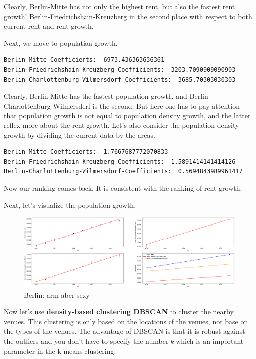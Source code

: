 \documentclass[11pt]{article}
\begin{document}
    
    Clearly, Berlin-Mitte has not only the highest rent, but also the
fastest rent growth! Berlin-Friedrichshain-Kreuzberg in the second place
with respect to both current rent and rent growth.

Next, we move to population growth.

    

    \begin{Verbatim}[commandchars=\\\{\}]
Berlin-Mitte-Coefficients:  6973.436363636361
Berlin-Friedrichshain-Kreuzberg-Coefficients:  3203.7090909090903
Berlin-Charlottenburg-Wilmersdorf-Coefficients:  3685.70303030303
    \end{Verbatim}

    Clearly, Berlin-Mitte has the fastest population growth, and
Berlin-Charlottenburg-Wilmersdorf is the second. But here one has to pay
attention that population growth is not equal to population density
growth, and the latter reflex more about the rent growth. Let's also
consider the population density growth by dividing the current data by
the areas.

    

    \begin{Verbatim}[commandchars=\\\{\}]
Berlin-Mitte-Coefficients:  1.7667687772070833
Berlin-Friedrichshain-Kreuzberg-Coefficients:  1.5891414141414126
Berlin-Charlottenburg-Wilmersdorf-Coefficients:  0.5694843989961417
    \end{Verbatim}

    Now our ranking comes back. It is consistent with the ranking of rent
growth.

Next, let's visualize the population growth.

    

        
    \begin{figure}
\centering
\includegraphics[width=16.5cm]{"output_57_1.png"}
\caption{Berlin: arm aber sexy}
\end{figure}

    
    Now let's use \textbf{density-based clustering DBSCAN} to cluster the
nearby venues. This clustering is only based on the locations of the
venues, not base on the types of the venues. The advantage of DBSCAN is
that it is robust against the outliers and you don't have to specify the
number \emph{k} which is an important parameter in the k-means
clustering.
\end{document}
